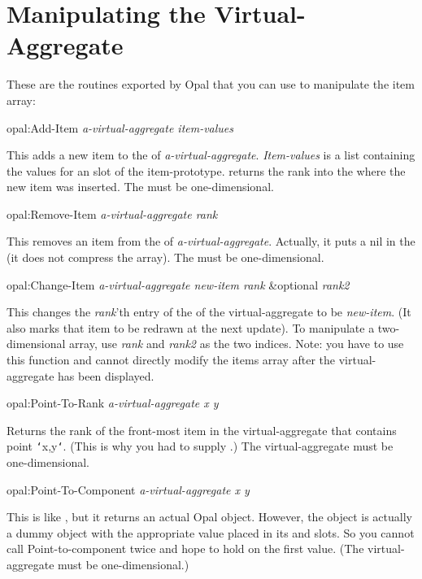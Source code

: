 \section{Manipulating the Virtual-Aggregate}
These are the routines exported by Opal that you can use to manipulate
the item array:

\begin{programexample}
opal:Add-Item {\it a-virtual-aggregate  item-values}\value{method}
\end{programexample}

This adds a new item to the  of {\it a-virtual-aggregate}.
{\it Item-values} is a list containing the values for an  slot
of the item-prototype.   returns the rank into the
 where the new item was inserted.  The
 must be one-dimensional.

\begin{programexample}
opal:Remove-Item {\it a-virtual-aggregate  rank}\value{method}
\end{programexample}
  This removes an item from the  of {\it a-virtual-aggregate}.
Actually, it puts a {\sc nil} in the  (it does not compress the
array).  The  must be one-dimensional.

\begin{programexample}
opal:Change-Item {\it a-virtual-aggregate  new-item  rank} \&optional {\it rank2}\value{method}
\end{programexample}
This changes the {\it rank}'th entry of the  of the
virtual-aggregate to be {\it new-item}.  (It also marks that item to be
redrawn at the next update).  To manipulate a two-dimensional array, use
{\it rank} and {\it rank2} as the two indices.  Note: you have to use
this function and cannot directly modify the items array after the
virtual-aggregate has been displayed.

\begin{programexample}
opal:Point-To-Rank {\it a-virtual-aggregate  x  y}\value{method}
\end{programexample}

Returns the rank of the front-most item in the virtual-aggregate
that contains point {\tt\char`\<}x,y{\tt\char`\>}.  (This is why you had to supply .)
The virtual-aggregate must be one-dimensional.

\begin{programexample}
opal:Point-To-Component {\it a-virtual-aggregate  x  y}\value{method}
\end{programexample}
  This is like , but it returns an actual Opal object.
However, the object is actually a dummy object with the appropriate
value placed in its  and  slots.  So you cannot call
Point-to-component twice and hope to hold on the first value.
(The virtual-aggregate must be one-dimensional.)

